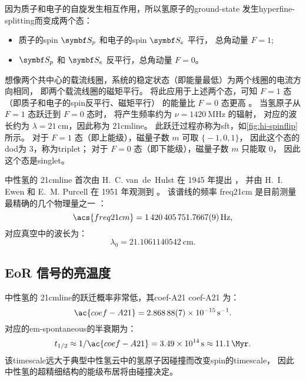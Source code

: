 因为质子和电子的自旋发生相互作用，所以氢原子的\ac{ground-state}
发生\ac{hyperfine-splitting}而变成两个态：
\begin{itemize}
  \item 质子的\ac{spin} $\B{S}_p$ 和电子的\ac{spin} $\B{S}_e$ 平行，
    总角动量 $F = 1$;
  \item $\B{S}_p$ 和 $\B{S}_e$ 反平行，总角动量 $F = 0$。
\end{itemize}
想像两个共中心的载流线圈，系统的稳定状态（即能量最低）为两个线圈的电流方向相同，
即两个载流线圈的磁矩平行。
将此应用于上述两个态，可知 $F = 1$ 态（即质子和电子的\ac{spin}反平行、磁矩平行）
的能量比 $F = 0$ 态更高 \cite{griffiths1982}。
当氢原子从 $F = 1$ 态跃迁到 $F = 0$ 态时，
将产生频率约为 $\nu = \SI{1420}{\MHz}$ 的辐射，
对应的波长约为 $\lambda = \SI{21}{\cm}$，因此称为 \acf{21cmline}。
此跃迁过程亦称为\acf{sft}，如\autoref{fig:hi-spinflip} 所示。
对于 $F = 1$ 态（即上能级），磁量子数 $m$ 可取 $\big\{ -1, 0, 1 \big\}$，
因此这个态的\ac{dod}为 3，称为\acf{triplet}；
对于 $F = 0$ 态（即下能级），磁量子数 $m$ 只能取 0，
因此这个态是\acf{singlet}。

中性氢的 \ac{21cmline}%
首次由 H.~C. van~de~Hulst 在 1945 年提出 \cite{vanDeHulst1945}，
并由 H.~I. Ewen 和 E.~M. Purcell 在 1951 年观测到 \cite{ewen1951}。
该谱线的频率 \ac{freq21cm} 是目前测量最精确的几个物理量之一
\cite{hellwig1970,essen1971}：
\begin{equation}
  \label{eq:hi-line-frequency}
  \acs{freq21cm} = \SI{1420405751.7667 +- 0.0009}{\Hz} ,
\end{equation}
对应真空中的波长为：
\begin{equation}
  \label{eq:hi-line-wavelength}
  \lambda_0 = \SI{21.1061140542}{\cm} .
\end{equation}

\subsection{EoR 信号的亮温度}

中性氢的 \ac{21cmline}的跃迁概率非常低，其\acl{coef-A21} \ac{coef-A21} 为：
\begin{equation}
  \ac{coef-A21} =
    \SI[separate-uncertainty=false]{2.86888(7)e-15}{\per\second} .
\end{equation}
对应的\ac{em-spontaneous}的半衰期为：
\begin{equation}
  t_{1/2} \approx 1 / \ac{coef-A21}
    = \SI{3.49e14}{\second} \approx \SI{11.1}{\Myr} .
\end{equation}
该\ac{timescale}远大于典型中性氢云中的氢原子因碰撞而改变\ac{spin}的\ac{timescale}，
因此中性氢的超精细结构的能级布居将由碰撞决定。

